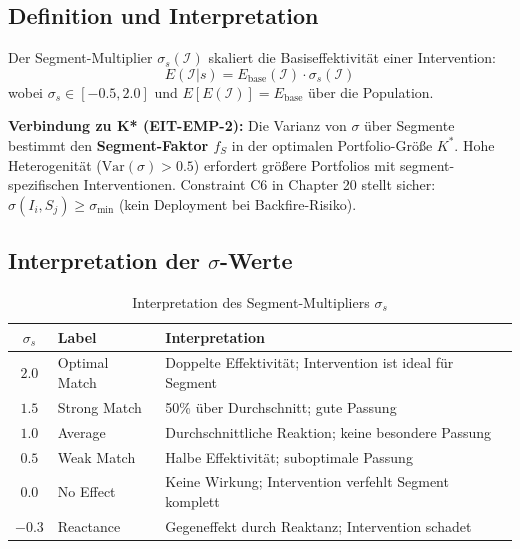 \subsection{Definition und Interpretation}

\begin{definition}
\label{def:19-sigma}
Der Segment-Multiplier $\sigma_s(\mathcal{I})$ skaliert die Basiseffektivität einer Intervention:
\begin{equation}
\boxed{E(\mathcal{I} | s) = E_{\text{base}}(\mathcal{I}) \cdot \sigma_s(\mathcal{I})}
\label{eq:19-segment-effect}
\end{equation}
wobei $\sigma_s \in [-0.5, 2.0]$ und $E[E(\mathcal{I})] = E_{\text{base}}$ über die Population.
\end{definition}

\textbf{Verbindung zu K* (EIT-EMP-2):} Die Varianz von $\sigma$ über Segmente bestimmt den \textbf{Segment-Faktor $f_S$} in der optimalen Portfolio-Größe $K^*$. Hohe Heterogenität ($\text{Var}(\sigma) > 0.5$) erfordert größere Portfolios mit segment-spezifischen Interventionen. Constraint C6 in Chapter 20 stellt sicher: $\sigma(I_i, S_j) \geq \sigma_{\min}$ (kein Deployment bei Backfire-Risiko).

\subsection{Interpretation der $\sigma$-Werte}

\begin{table}[htbp]
\centering
\caption{Interpretation des Segment-Multipliers $\sigma_s$}
\label{tab:19-sigma-interpretation}
\renewcommand{\arraystretch}{1.4}
\begin{tabular}{@{}clp{8cm}@{}}
\toprule
\textbf{$\sigma_s$} & \textbf{Label} & \textbf{Interpretation} \\
\midrule
$2.0$ & Optimal Match & Doppelte Effektivität; Intervention ist ideal für Segment \\
$1.5$ & Strong Match & 50\% über Durchschnitt; gute Passung \\
$1.0$ & Average & Durchschnittliche Reaktion; keine besondere Passung \\
$0.5$ & Weak Match & Halbe Effektivität; suboptimale Passung \\
$0.0$ & No Effect & Keine Wirkung; Intervention verfehlt Segment komplett \\
$-0.3$ & Reactance & Gegeneffekt durch Reaktanz; Intervention schadet \\
\bottomrule
\end{tabular}
\end{table}

